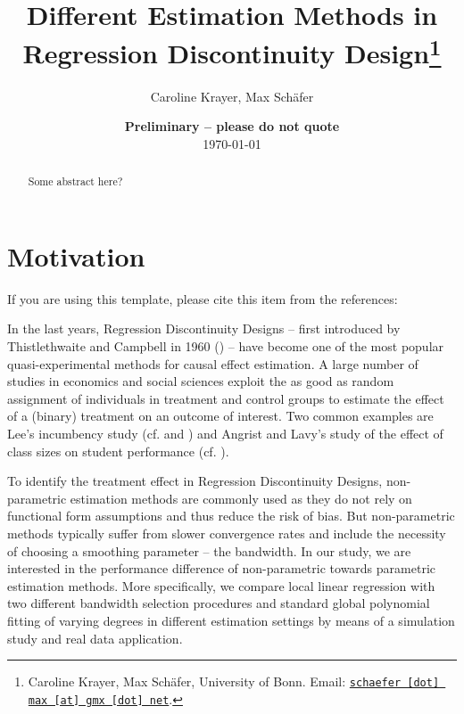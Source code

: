 \documentclass[11pt, a4paper, leqno]{article}
\begin{document}
\title{Different Estimation Methods in Regression Discontinuity Design\thanks{Caroline Krayer, Max Schäfer, University of Bonn. Email: \href{mailto:schaefer.max@gmx.net}{\nolinkurl{schaefer [dot] max [at] gmx [dot] net}}.}}

\author{Caroline Krayer, Max Schäfer}

\date{
{\bf Preliminary -- please do not quote}
\\[1ex]
\today
}

\maketitle


\begin{abstract}
	Some abstract here?
\end{abstract}
\clearpage

\section{Motivation} %
\label{sec:motivation}

If you are using this template, please cite this item from the references: \citet{GaudeckerEconProjectTemplates}

In the last years, Regression Discontinuity Designs -- first introduced by Thistlethwaite and Campbell in 1960 (\cite{thistlethwaite_campbell}) -- have become one of the most popular quasi-experimental methods for causal effect estimation. A large number of studies in economics and social sciences exploit the as good as random assignment of individuals in treatment and control groups to estimate the effect of a (binary) treatment on an outcome of interest. Two common examples are Lee's incumbency study (cf. \cite{lee_2001} and \cite{lee_2007})
and Angrist and Lavy's study of the effect of class sizes on student performance (cf. \cite{angrist_lavy}).

To identify the treatment effect in Regression Discontinuity Designs, non-parametric estimation methods are commonly used as they do not rely on functional form assumptions and thus reduce the risk of bias. But non-parametric methods typically suffer from slower convergence rates and include the necessity of choosing a smoothing parameter -- the bandwidth. In our study, we are interested in the performance difference of non-parametric towards parametric estimation methods. More specifically, we compare local linear regression with two different bandwidth selection procedures and standard global polynomial fitting of varying degrees in different estimation settings by means of a simulation study and real data application.
\end{document}
